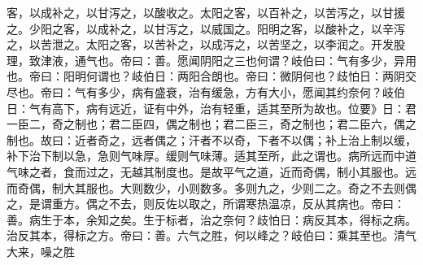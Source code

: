 \documentclass[a4paper,12pt,UTF8,twoside]{ctexbook}
\begin{document}
客，以成补之，以甘泻之，以酸收之。太阳之客，以百补之，以苦泻之，以甘援之。少阳之客，以成补之，以甘泻之，以威国之。阳明之客，以酸补之，以辛泻之，以苦泄之。太阳之客，以苦补之，以成泻之，以苦坚之，以李润之。开发股理，致津液，通气也。帝曰：善。愿闻阴阳之三也何谓？岐伯曰：气有多少，异用也。帝曰：阳明何谓也？岐伯日：两阳合朗也。帝曰：微阴何也？歧怕日：两阴交尽也。帝曰：气有多少，病有盛衰，治有缓急，方有大小，愿闻其约奈何？岐伯日：气有高下，病有远近，证有中外，治有轻重，适其至所为故也。位要》日：君一臣二，奇之制也；君二臣四，偶之制也；君二臣三，奇之制也；君二臣六，偶之制也。故曰：近者奇之，远者偶之；汗者不以奇，下者不以偶；补上治上制以缓，补下治下制以急，急则气味厚。缓则气味薄。适其至所，此之谓也。病所远而中道气味之者，食而过之，无越其制度也。是故平气之道，近而奇偶，制小其服也。远而奇偶，制大其服也。大则数少，小则数多。多则九之，少则二之。奇之不去则偶之，是谓重方。偶之不去，则反佐以取之，所谓寒热温凉，反从其病也。帝曰：善。病生于本，余知之矣。生于标者，治之奈何？歧怕日：病反其本，得标之病。治反其本，得标之方。帝曰：善。六气之胜，何以峰之？岐伯曰：乘其至也。清气大来，噪之胜
\end{document}
